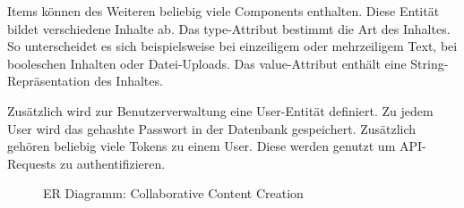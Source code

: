 Items können des Weiteren beliebig viele Components enthalten.  Diese Entität
bildet verschiedene Inhalte ab.  Das type-Attribut bestimmt die Art des
Inhaltes. So unterscheidet es sich beispielsweise bei einzeiligem oder
mehrzeiligem Text, bei booleschen Inhalten oder Datei-Uploads.  Das
value-Attribut enthält eine String-Repräsentation des Inhaltes.

Zusätzlich wird zur Benutzerverwaltung eine User-Entität definiert.  Zu jedem
User wird das gehashte Passwort in der Datenbank gespeichert.  Zusätzlich
gehören beliebig viele Tokens zu einem User.  Diese werden genutzt um
API-Requests zu authentifizieren.

\begin{figure}
    \centering
    
    \caption{ER Diagramm: Collaborative Content Creation}
    \label{fig:er_ccc}
\end{figure}
